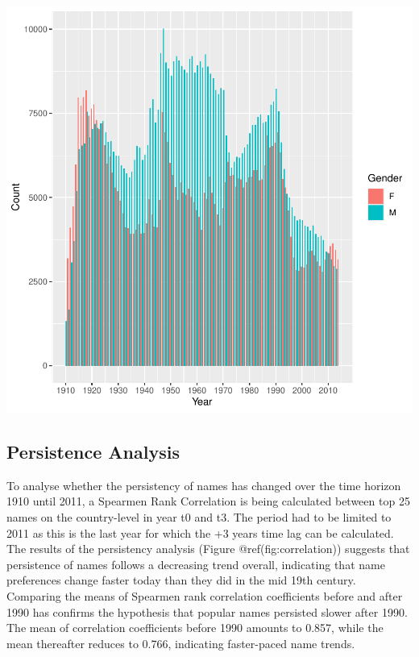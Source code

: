\documentclass[11pt,preprint]{elsarticle}
\let\origfigure\figure
\let\endorigfigure\endfigure
\renewenvironment{figure}[1][2] {
    \expandafter\origfigure\expandafter[H]
} {
    \endorigfigure
}
\numberwithin{equation}{section}
\numberwithin{figure}{section}
\numberwithin{table}{section}
\begin{document}
\begin{figure}
\centering
\includegraphics{Task_1_ReadMe_files/figure-latex/unnamed-chunk-3-1.pdf}
\caption{Mainstream Analysis}
\end{figure}

\subsection{Persistence Analysis}\label{persistence-analysis}

To analyse whether the persistency of names has changed over the time
horizon 1910 until 2011, a Spearmen Rank Correlation is being calculated
between top 25 names on the country-level in year t0 and t3. The period
had to be limited to 2011 as this is the last year for which the +3
years time lag can be calculated. The results of the persistency
analysis (Figure @ref(fig:correlation)) suggests that persistence of
names follows a decreasing trend overall, indicating that name
preferences change faster today than they did in the mid 19th century.
Comparing the means of Spearmen rank correlation coefficients before and
after 1990 has confirms the hypothesis that popular names persisted
slower after 1990. The mean of correlation coefficients before 1990
amounts to 0.857, while the mean thereafter reduces to 0.766, indicating
faster-paced name trends.
\end{document}
